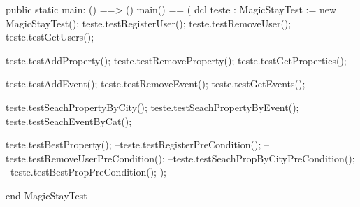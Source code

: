 \begin{vdmpp}[breaklines=true]
 public static main: () ==> ()
  main() ==
  (
   dcl teste : MagicStayTest := new MagicStayTest();
   teste.testRegisterUser();
   teste.testRemoveUser();
   teste.testGetUsers();
   
   teste.testAddProperty();
   teste.testRemoveProperty();
   teste.testGetProperties();
   
   teste.testAddEvent();
   teste.testRemoveEvent();
   teste.testGetEvents();
   
   teste.testSeachPropertyByCity();
   teste.testSeachPropertyByEvent();
   teste.testSeachEventByCat();
   
   teste.testBestProperty();
   --teste.testRegisterPreCondition();
   --teste.testRemoveUserPreCondition();
   --teste.testSeachPropByCityPreCondition();
   --teste.testBestPropPreCondition();
   );
  
end MagicStayTest
\end{vdmpp}
\bigskip
